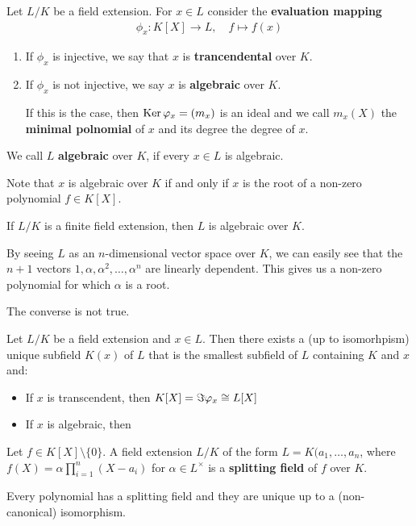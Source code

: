 \begin{dfn}[]
  Let $L/K$ be a field extension. For $x \in L$ consider the \textbf{evaluation mapping}
  \begin{align*}
    \phi_x: K[X] \to L,\quad f \mapsto  f(x)
  \end{align*}
  \begin{enumerate}
    \item If $\phi_x$ is injective, we say that $x$ is \textbf{trancendental} over $K$.
    \item If $\phi_x$ is not injective, we say $x$ is \textbf{algebraic} over $K$.
      
      If this is the case, then $\operatorname{Ker} \varphi_x = (m_x)$ is an ideal and we call $m_x(X)$ the \textbf{minimal polnomial} of $x$ and its degree the degree of $x$.
  \end{enumerate}
  We call $L$ \textbf{algebraic} over $K$, if every $x \in L$ is algebraic.
\end{dfn}
Note that $x$ is algebraic over $K$ if and only if $x$ is the root of a non-zero polynomial $f \in K[X]$.

\begin{prop}[]
  If $L/K$ is a finite field extension, then $L$ is algebraic over $K$.
\end{prop}
By seeing $L$ as an $n$-dimensional vector space over $K$, we can easily see that the $n+1$ vectors $1, \alpha, \alpha^{2}, \ldots, \alpha^{n}$ are linearly dependent. This gives us a non-zero polynomial for which $\alpha$ is a root.

The converse is not true.



\begin{prop}[]
  Let $L/K$ be a field extension and $x \in L$. 
  Then there exists a (up to isomorhpism) unique subfield $K(x)$ of $L$ that is the smallest subfield of $L$ containing $K$ and $x$ and:
  \begin{itemize}
    \item If $x$ is transcendent, then $K[X] = \Im \varphi_x \cong L[X]$
    \item If $x$ is algebraic, then
  \end{itemize}

\end{prop}



\begin{dfn}[]
  Let $f \in K[X] \setminus \{0\}$. A field extension $L/K$ of the form $L = K(a_{1}, \ldots, a_{n}$, where $f(X) = \alpha \prod_{i=1}^{n}(X - a_i)$ for $\alpha \in L^{\times}$ is a \textbf{splitting field} of $f$ over $K$.
\end{dfn}
Every polynomial has a splitting field and they are unique up to a (non-canonical) isomorphism.



